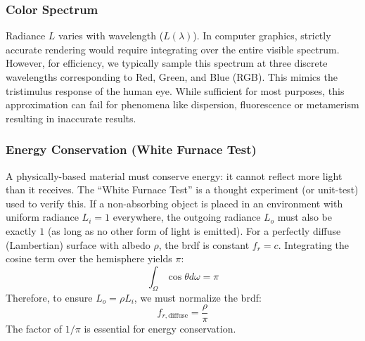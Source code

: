 \subsubsection{Color Spectrum}

Radiance $L$ varies with wavelength ($L(\lambda)$).
In computer graphics, strictly accurate rendering would require integrating over the entire visible spectrum.
However, for efficiency, we typically sample this spectrum at three discrete wavelengths corresponding to Red, Green,
and Blue (RGB).
This mimics the tristimulus response of the human eye.
While sufficient for most purposes, this approximation can fail for phenomena like
dispersion, fluorescence or metamerism resulting in inaccurate results.

\subsubsection{Energy Conservation (White Furnace Test)}

A physically-based material must conserve energy: it cannot reflect more light than it receives.
The ``White Furnace Test'' is a thought experiment (or unit-test) used to verify this.
If a non-absorbing object is placed in an environment with uniform radiance $L_i = 1$ everywhere,
the outgoing radiance $L_o$ must also be exactly $1$ (as long as no other form of light is emitted).
For a perfectly diffuse (Lambertian) surface with albedo $\rho$, the \gls{brdf} is constant $f_r = c$.
Integrating the cosine term over the hemisphere yields $\pi$:
\[
    \int_{\Omega} \cos\theta d\omega = \pi
\]
Therefore, to ensure $L_o = \rho L_i$, we must normalize the \gls{brdf}:
\[
f_{r, \text{diffuse}} = \frac{\rho}{\pi}
\]
The factor of $1/\pi$ is essential for energy conservation.